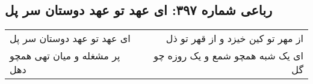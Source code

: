 \begin{center}
\section*{رباعی شماره ۳۹۷: ای عهد تو عهد دوستان سر پل}
\label{sec:sh397}
\begin{longtable}{l p{0.5cm} r}
ای عهد تو عهد دوستان سر پل
&&
از مهر تو کین خیزد و از قهر تو ذل
\\
پر مشغله و میان تهی همچو دهل
&&
ای یک شبه همچو شمع و یک روزه چو گل
\\
\end{longtable}
\end{center}
